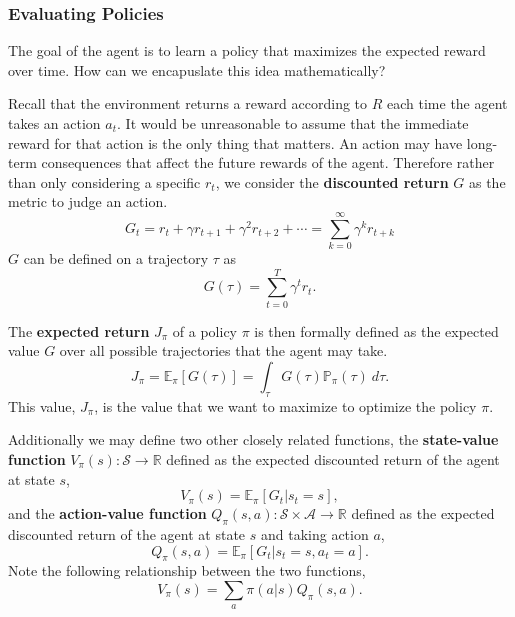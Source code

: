 \documentclass[12pt]{report}
\theoremstyle{definition}
\theoremstyle{remark}
\begin{document}
\subsubsection{Evaluating Policies}
The goal of the agent is to learn a policy that maximizes the expected reward over time. How can we encapuslate this idea mathematically?

Recall that the environment returns a reward according to $R$ each time the agent takes an action $a_t$. It would be unreasonable to assume that the immediate reward for that action is the only thing that matters. An action may have long-term consequences that affect the future rewards of the agent. Therefore rather than only considering a specific $r_t$, we consider the \textbf{discounted return} $G$ as the metric to judge an action.
\begin{equation}
    G_t = r_t + \gamma r_{t+1} + \gamma^2 r_{t+2} + \cdots = \sum_{k=0}^{\infty} \gamma^k r_{t+k}
\end{equation}
$G$ can be defined on a trajectory $\tau$ as
\begin{equation}
    G(\tau) = \sum_{t=0}^{T} \gamma^t r_t.
\end{equation}

The \textbf{expected return} $J_\pi$ of a policy $\pi$ is then formally defined as the expected value $G$ over all possible trajectories that the agent may take.
\begin{equation}\label{eq:expected-return}
    J_\pi = \mathbb{E}_\pi[G(\tau)] = \int_{\tau} G(\tau)\mathbb{P}_\pi(\tau)\ d\tau.
\end{equation}
This value, $J_\pi$, is the value that we want to maximize to optimize the policy $\pi$.

Additionally we may define two other closely related functions, the \textbf{state-value function} $V_\pi(s): \mathcal{S} \to \mathbb{R}$ defined as the expected discounted return of the agent at state $s$,
\begin{equation}
    V_\pi(s) = \mathbb{E}_\pi[G_t | s_t = s],
\end{equation}
and the \textbf{action-value function} $Q_\pi(s, a): \mathcal{S} \times \mathcal{A} \to \mathbb{R}$ defined as the expected discounted return of the agent at state $s$ and taking action $a$,
\begin{equation}
    Q_\pi(s, a) = \mathbb{E}_\pi[G_t | s_t = s, a_t = a].
\end{equation}
Note the following relationship between the two functions,
\begin{equation}
    V_\pi(s) = \sum_a \pi(a | s) Q_\pi(s, a).
\end{equation}
\end{document}
